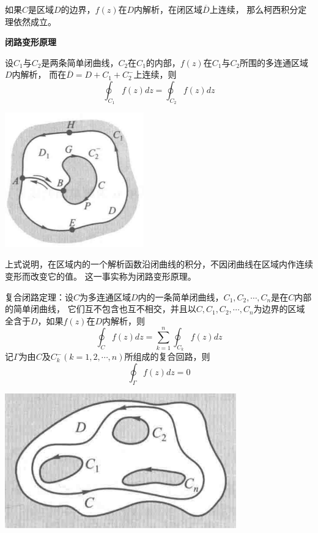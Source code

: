 \documentclass[a4paper,12pt]{article}
\begin{document}
如果$C$是区域$D$的边界，$f\left(z\right)$在$D$内解析，在闭区域$\overline{D}$上连续，
那么柯西积分定理依然成立。

\noindent
\textbf{闭路变形原理}

设$C_1$与$C_2$是两条简单闭曲线，$C_2$在$C_1$的内部，$f\left(z\right)$在$C_1$与$C_2$所围的多连通区域$D$内解析，
而在$\overline{D}=D+C_1+C_2^-$上连续，则
$$
\oint_{C_1}f\left(z\right)dz=\oint_{C_2}f\left(z\right)dz
$$

\begin{center}
    \includegraphics[width=6cm]{闭路变形原理.png}
\end{center}

上式说明，在区域内的一个解析函数沿闭曲线的积分，不因闭曲线在区域内作连续变形而改变它的值。
这一事实称为闭路变形原理。

复合闭路定理：设$C$为多连通区域$D$内的一条简单闭曲线，$C_1,C_2,\cdots,C_n$是在$C$内部的简单闭曲线，
它们互不包含也互不相交，并且以$C,C_1,C_2,\cdots,C_n$为边界的区域全含于$D$，如果$f\left(z\right)$在$D$内解析，则
$$
\oint_Cf\left(z\right)dz=\sum_{k=1}^n\oint_{C_k}f\left(z\right)dz
$$
记$\Gamma$为由$C$及$C_k^-\left(k=1,2,\cdots,n\right)$所组成的复合回路，则
$$
\oint_\Gamma f\left(z\right)dz=0
$$

\begin{center}
    \includegraphics[width=10cm]{复合闭路定理.png}
\end{center}
\end{document}
